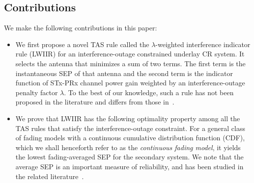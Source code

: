 \documentclass[12pt,draftcls,peerreview,onecolumn]{IEEEtran}
\newcommand{\lam}{\lambda}
\begin{document}
\subsection{Contributions} 
We make the following contributions in this paper:
\begin{itemize}
\item We first propose a novel TAS rule called the $\lam$-weighted interference indicator rule (LWIIR) for an interference-outage constrained %
underlay CR system. It selects the antenna that minimizes a sum of two terms. The first term is the instantaneous SEP of that antenna and the second term is the indicator function of STx-PRx channel power gain weighted by an interference-outage penalty factor $\lam$. To the best of our knowledge, such a rule has not been proposed in the literature and differs from those in~\cite{Wang_2011_TCom,Dmochowski_2011_CROWNCOM,Wang_2010_TWC}.

\item We prove that LWIIR has the following optimality property among all the TAS rules that satisfy the interference-outage constraint.  For a general class of fading models with a continuous cumulative distribution function (CDF), which we shall henceforth refer to as the {\em continuous fading model}, it yields the lowest fading-averaged SEP for the secondary system. We note that the average SEP is an important measure of reliability, and has been studied in the related literature~\cite{Fakhan_2014_TSP,Kashyap_2014_TCOM,Sarvendranath_2013_TCOM,Sarvendranath_2014_TCOM,li_2011_pimrc,Suraweera_2010_TVT}. 


\end{itemize}
\end{document}
